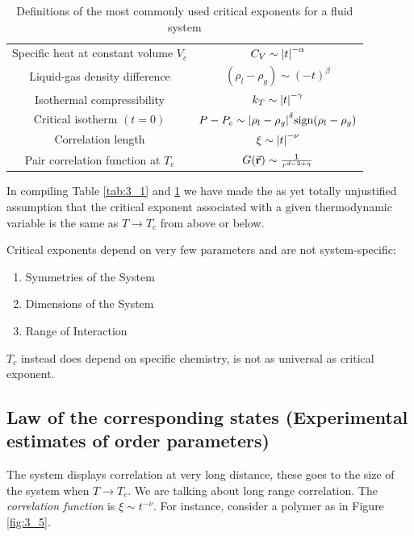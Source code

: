 \documentclass[../../Main/Main.tex]{subfiles}
\begin{document}
\begin{table}[H]
  \begin{center}
\begin{tabular}{cc}
\toprule
Specific heat at constant volume \( V_c \)  & \( C_V \sim \abs{t}^{-\alpha }  \) \\
Liquid-gas density difference & \( (\rho _l - \rho _g)\sim (-t)^{\beta } \) \\
Isothermal compressibility & \( k _T \sim \abs{t}^{-\gamma  }  \) \\
 Critical isotherm \( (t=0) \) & \( P-P_c \sim \abs{\rho _l - \rho _g}^\delta \text{sign} (\rho _l - \rho _g)  \)  \\
 Correlation length & \( \xi \sim \abs{t}^{- \nu }  \) \\
 Pair correlation function at \( T_c \) & \( G (\va{r}) \sim \frac{1}{r^{d-2+ \eta }} \) \\
\bottomrule
\end{tabular}
\end{center}
\caption{ \label{tab:3_2} Definitions of the most commonly used critical exponents for a fluid system}
\end{table}

\begin{remark}
In compiling Table \ref{tab:3_1} and \ref{tab:3_2} we have made the as yet totally unjustified assumption that the critical exponent associated with a given thermodynamic variable is the same as \( T \rightarrow T_c \) from above or below.
\end{remark}
Critical exponents depend on very few parameters and are not system-specific:\begin{enumerate}
\itemsep0em
	\item Symmetries of the System
	\item Dimensions of the System
	\item Range of Interaction
\end{enumerate}
$T_c$ instead does depend on specific chemistry, is not as universal as critical exponent.


\subsection{Law of the corresponding states (Experimental estimates of order parameters)}
The system displays correlation at very long distance, these goes to the size of the system when \( T \rightarrow T_c \). We are talking about long range correlation. The \emph{correlation function} is \( \xi \sim t^{-\nu } \).
For instance, consider a polymer as in Figure \ref{fig:3_5}.
\end{document}
